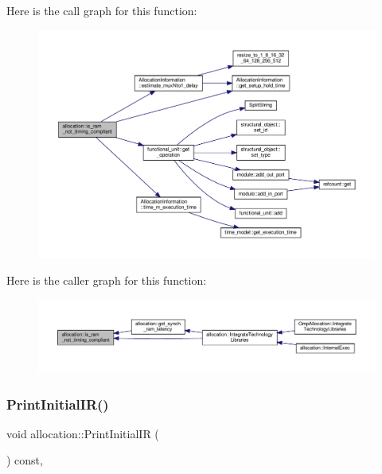 Here is the call graph for this function\+:
\nopagebreak
\begin{figure}[H]
\begin{center}
\leavevmode
\includegraphics[width=350pt]{d0/d74/classallocation_a0ade22133e76bb62a10d4dc280842f01_cgraph}
\end{center}
\end{figure}
Here is the caller graph for this function\+:
\nopagebreak
\begin{figure}[H]
\begin{center}
\leavevmode
\includegraphics[width=350pt]{d0/d74/classallocation_a0ade22133e76bb62a10d4dc280842f01_icgraph}
\end{center}
\end{figure}
\mbox{\label{classallocation_aa977c26d2952e7fc0e7f09037c540bd3}} 
\subsubsection{\texorpdfstring{Print\+Initial\+I\+R()}{PrintInitialIR()}}
{\footnotesize\ttfamily void allocation\+::\+Print\+Initial\+IR (\begin{DoxyParamCaption}{ }\end{DoxyParamCaption}) const\hspace{0.3cm}{\ttfamily [override]}, {\ttfamily [virtual]}}



